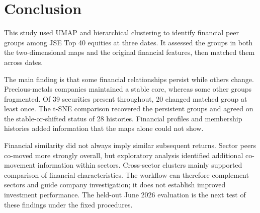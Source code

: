 \section{Conclusion}

This study used UMAP and hierarchical clustering to identify financial peer groups among JSE Top 40 equities at three dates. It assessed the groups in both the two-dimensional maps and the original financial features, then matched them across dates.

The main finding is that some financial relationships persist while others change. Precious-metals companies maintained a stable core, whereas some other groups fragmented. Of 39 securities present throughout, 20 changed matched group at least once. The t-SNE comparison recovered the persistent groups and agreed on the stable-or-shifted status of 28 histories. Financial profiles and membership histories added information that the maps alone could not show.

Financial similarity did not always imply similar subsequent returns. Sector peers co-moved more strongly overall, but exploratory analysis identified additional co-movement information within sectors. Cross-sector clusters mainly supported comparison of financial characteristics. The workflow can therefore complement sectors and guide company investigation; it does not establish improved investment performance. The held-out June 2026 evaluation is the next test of these findings under the fixed procedures.
